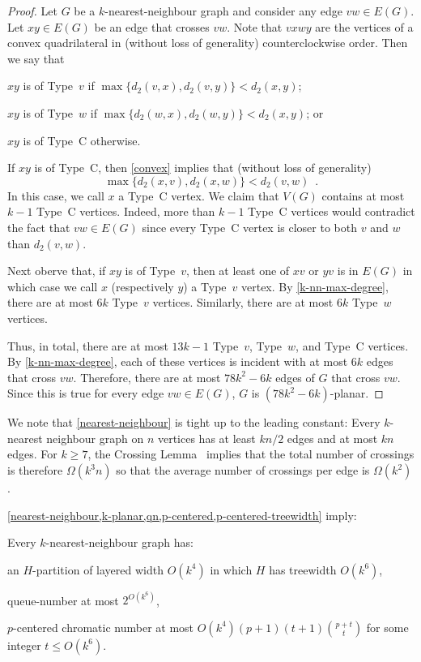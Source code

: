 \documentclass{patmorin}
\renewcommand{\ge}{\geqslant}
\renewcommand{\leq}{\leqslant}
\begin{document}
\begin{proof}
  Let $G$ be a $k$-nearest-neighbour graph and consider any edge $vw\in E(G)$.
  Let $xy\in E(G)$ be an edge that crosses $vw$.  Note that $vxwy$ are the vertices of a convex quadrilateral in (without loss of generality) counterclockwise order. Then we say that 
  \begin{compactenum}
    \item $xy$ is of Type~$v$ if $\max\{d_2(v,x), d_2(v,y)\}< d_2(x,y)$;
    \item $xy$ is of Type~$w$ if $\max\{d_2(w,x), d_2(w,y)\}< d_2(x,y)$; or
    \item $xy$ is of Type~C otherwise.
  \end{compactenum}
  If $xy$ is of Type~C, then \cref{convex} implies that (without loss of generality) 
  \[\max\{d_2(x,v),d_2(x,w)\} < d_2(v,w)\enspace.\] 
   In this case, we call $x$ a Type~C vertex.  We claim that $V(G)$ contains at most $k-1$ Type~C vertices.  Indeed, more than $k-1$ Type~C vertices would contradict the fact that $vw\in E(G)$ since every Type~C vertex is closer to both $v$ and $w$ than $d_2(v,w)$.
  
  Next oberve that, if $xy$ is of Type~$v$, then at least one of $xv$ or $yv$ is in $E(G)$ in which case we call $x$ (respectively $y$) a Type~$v$ vertex.  By \cref{k-nn-max-degree}, there are at most $6k$ Type~$v$ vertices.  Similarly, there are at most $6k$ Type~$w$ vertices.
  
  Thus, in total, there are at most $13k-1$ Type~$v$, Type~$w$, and Type~C vertices. By \cref{k-nn-max-degree}, each of these vertices is incident with at most $6k$ edges that cross $vw$. Therefore, there are at most $78k^2-6k$ edges of $G$ that cross $vw$.  Since this is true for every edge $vw\in E(G)$, $G$ is $(78k^2-6k)$-planar.
\end{proof}

We note that \cref{nearest-neighbour} is tight up to the leading constant:  Every $k$-nearest neighbour graph on $n$ vertices has at least $kn/2$ edges and at most $kn$ edges.  For $k\ge 7$, the Crossing Lemma~\citep{ajtai.chvatal.ea:crossing-free,leighton:complexity} implies that the total number of crossings is therefore $\Omega(k^3n)$ so that the average number of crossings per edge is $\Omega(k^2)$.

\cref{nearest-neighbour,k-planar,qn,p-centered,p-centered-treewidth} imply:

\begin{cor}
\label{k-nn}
Every $k$-nearest-neighbour graph has:
\begin{compactitem}
\item an $H$-partition of layered width $O(k^4)$ in which $H$ has treewidth $O(k^6)$,
\item queue-number at most $2^{O(k^6)}$,
\item $p$-centered chromatic number at most $O(k^4) (p+1) (t+1)\binom{p+t}{t}$ for some integer $t\leq O(k^6)$.
\end{compactitem}
\end{cor}
\end{document}

